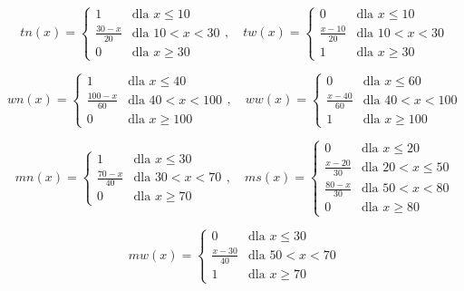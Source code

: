\documentclass{article}
\begin{document}
\begin{equation*}
    tn(x) = \begin{cases}
        1 & \text{dla } x \leq 10 \\
        \frac{30 - x}{20} & \text{dla } 10 < x < 30 \\
        0 & \text{dla } x \geq 30
    \end{cases}, \quad
    tw(x) = \begin{cases}
        0 & \text{dla } x \leq 10 \\
        \frac{x - 10}{20} & \text{dla } 10 < x < 30 \\
        1 & \text{dla } x \geq 30
    \end{cases}
\end{equation*}

\begin{equation*}
    wn(x) = \begin{cases}
        1 & \text{dla } x \leq 40 \\
        \frac{100 - x}{60} & \text{dla } 40 < x < 100 \\
        0 & \text{dla } x \geq 100
    \end{cases}, \quad
    ww(x) = \begin{cases}
        0 & \text{dla } x \leq 60 \\
        \frac{x - 40}{60} & \text{dla } 40 < x < 100 \\
        1 & \text{dla } x \geq 100
    \end{cases}
\end{equation*}

\begin{equation*}
    mn(x) = \begin{cases}
        1 & \text{dla } x \leq 30 \\
        \frac{70 - x}{40} & \text{dla } 30 < x < 70 \\
        0 & \text{dla } x \geq 70
    \end{cases}, \quad
    ms(x) = \begin{cases}
        0 & \text{dla } x \leq 20 \\
        \frac{x - 20}{30} & \text{dla } 20 < x \leq 50 \\
        \frac{80 - x}{30} & \text{dla } 50 < x < 80 \\
        0 & \text{dla } x \geq 80
    \end{cases}
\end{equation*}

\begin{equation*}
    mw(x) = \begin{cases}
        0 & \text{dla } x \leq 30 \\
        \frac{x - 30}{40} & \text{dla } 50 < x < 70 \\
        1 & \text{dla } x \geq 70
    \end{cases}
\end{equation*}
\end{document}
